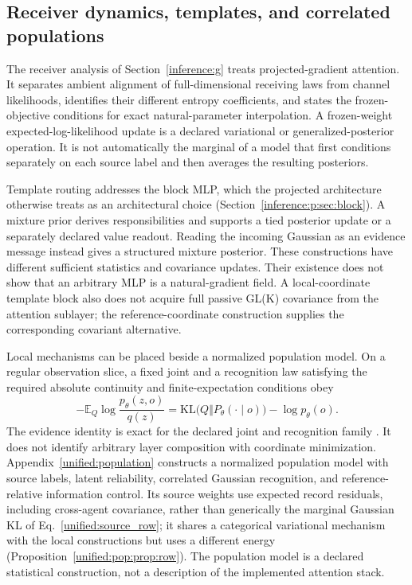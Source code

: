 \documentclass[11pt]{article}
\theoremstyle{definition}
\theoremstyle{remark}
\begin{document}
\subsection{Receiver dynamics, templates, and correlated populations}
\label{unified:companions}

The receiver analysis of Section~\ref{inference:g} treats projected-gradient attention. It separates ambient alignment of full-dimensional receiving laws from channel likelihoods, identifies their different entropy coefficients, and states the frozen-objective conditions for exact natural-parameter interpolation. A frozen-weight expected-log-likelihood update is a declared variational or generalized-posterior operation. It is not automatically the marginal of a model that first conditions separately on each source label and then averages the resulting posteriors.

Template routing addresses the block MLP, which the projected architecture otherwise treats as an architectural choice (Section~\ref{inference:p:sec:block}). A mixture prior derives responsibilities and supports a tied posterior update or a separately declared value readout. Reading the incoming Gaussian as an evidence message instead gives a structured mixture posterior. These constructions have different sufficient statistics and covariance updates. Their existence does not show that an arbitrary MLP is a natural-gradient field. A local-coordinate template block also does not acquire full passive GL(K) covariance from the attention sublayer; the reference-coordinate construction supplies the corresponding covariant alternative.

Local mechanisms can be placed beside a normalized population model. On a regular observation slice, a fixed joint and a recognition law satisfying the required absolute continuity and finite-expectation conditions obey
\begin{equation}
-\mathbb E_Q\log\frac{p_\theta(z,o)}{q(z)}=\mathrm{KL}\bigl(Q\Vert P_\theta(\cdot\mid o)\bigr)-\log p_\theta(o).
\label{unified:elbo}
\end{equation}
The evidence identity is exact for the declared joint and recognition family \cite{unified:blei2017}. It does not identify arbitrary layer composition with coordinate minimization. Appendix~\ref{unified:population} constructs a normalized population model with source labels, latent reliability, correlated Gaussian recognition, and reference-relative information control. Its source weights use expected record residuals, including cross-agent covariance, rather than generically the marginal Gaussian KL of Eq.~\eqref{unified:source_row}; it shares a categorical variational mechanism with the local constructions but uses a different energy (Proposition~\ref{unified:pop:prop:row}). The population model is a declared statistical construction, not a description of the implemented attention stack.
\end{document}
